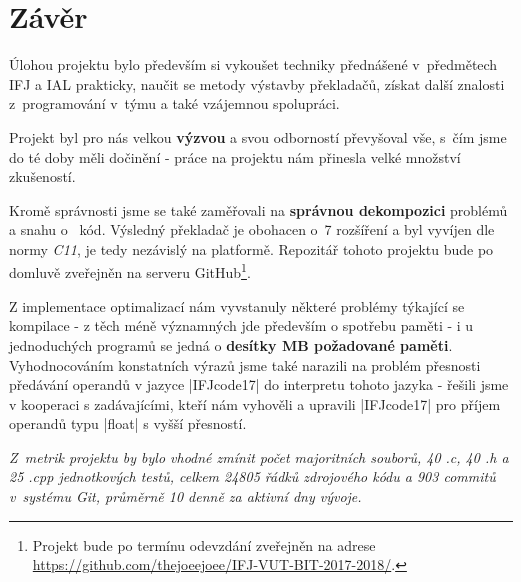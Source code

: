 \section{Závěr}
Úlohou projektu bylo především si vykoušet techniky přednášené v~předmětech IFJ a IAL prakticky,
naučit se metody výstavby překladačů, získat další znalosti z~programování v~týmu a také vzájemnou spolupráci.

Projekt byl pro nás velkou \textbf{výzvou} a svou odborností převyšoval vše, s~čím jsme do té doby měli dočinění - práce na projektu nám přinesla velké množství zkušeností.

Kromě správnosti jsme se také zaměřovali na \textbf{správnou dekompozici} problémů a snahu o~ kód. Výsledný překladač je obohacen o~7 rozšíření a byl vyvíjen dle normy \emph{C11}, je tedy nezávislý na platformě. Repozitář tohoto projektu bude po domluvě zveřejněn na serveru GitHub\footnote{Projekt bude po termínu odevzdání zveřejněn na adrese \href{https://github.com/thejoeejoee/IFJ-VUT-BIT-2017-2018/}{https://github.com/thejoeejoee/IFJ-VUT-BIT-2017-2018/}.}.

Z implementace optimalizací nám vyvstanuly některé problémy týkající se kompilace - z těch méně významných jde především o spotřebu paměti - i u jednoduchých programů se jedná o \textbf{desítky MB požadované paměti}. Vyhodnocováním konstatních výrazů jsme také narazili na problém přesnosti předávání operandů v jazyce \ic|IFJcode17| do interpretu tohoto jazyka - řešili jsme v kooperaci s zadávajícími, kteří nám vyhověli a upravili \ic|IFJcode17| pro příjem operandů typu \ic|float| s vyšší přesností.

\emph{
	Z~metrik projektu by bylo vhodné zmínit počet majoritních souborů, 40 .c, 40 .h a 25 .cpp jednotkových testů, celkem \emph{24805} řádků zdrojového kódu a \emph{903} commitů v~systému \emph{Git}, průměrně \emph{10} denně za aktivní dny vývoje.
}


